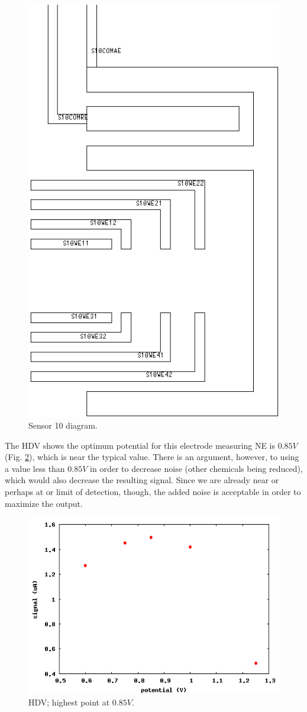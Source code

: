 \documentclass[twocolumn]{article}
\begin{document}
\begin{figure}
\centering
\includegraphics[height=\linewidth]{figures/s10.png}
\caption{Sensor 10 diagram.}
\label{sensor-10}
\end{figure}

The HDV shows the optimum potential for this electrode measuring NE is $0.85V$ (Fig. \ref{hdv}), which is near the typical value. There is an argument, however, to using a value less than $0.85V$ in order to decrease noise (other chemicals being reduced), which would also decrease the resulting signal. Since we are already near or perhaps at or limit of detection, though, the added noise is acceptable in order to maximize the output.

\begin{figure}
\centering
\includegraphics[width=\linewidth]{figures/hdv.png}
\caption{HDV; highest point at $0.85V$.}
\label{hdv}
\end{figure}
\end{document}
